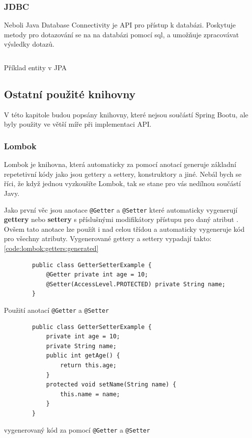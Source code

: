 \subsubsection*{JDBC}\label{sec:impl:jdbc}
Neboli Java Database Connectivity je API pro přístup k databázi. Poskytuje metody pro dotazování se na na databázi pomocí \gls{sql}, a umožňuje zpracovávat výsledky dotazů.

\begin{listing}[ht!]
    \inputminted[]{Java}{resources/code/impl/EnemyDTO.java}
    \caption{Příklad entity v JPA}
    \label{code:jpa_entity}
\end{listing}


\subsection{Ostatní použité knihovny} %
V této kapitole budou popsány knihovny, které nejsou součástí Spring Bootu, ale byly použity ve větší míře při implementaci API.

\subsubsection*{Lombok}\label{sec:impl:lombok}
Lombok je knihovna, která automaticky za pomocí anotací generuje základní repetetivní kódy jako jsou gettery a settery, konstruktory a jiné. Nebál bych se říci, že když jednou vyzkoušíte Lombok, tak se stane pro vás nedílnou součástí Javy.

Jako první věc jsou anotace \texttt{@Getter} a \texttt{@Setter} které automaticky vygenerují \textbf{gettery} nebo \textbf{settery} s příslušnými modifikátory přístupu pro daný atribut . Ovšem tato anotace lze použít i nad celou třídou a automaticky vygeneruje kód pro všechny atributy. Vygenerované gettery a settery vypadají takto: \ref{code:lombok:getters:generated}
\begin{listing}[H]
    \begin{verbatim}
        public class GetterSetterExample {
            @Getter private int age = 10;
            @Setter(AccessLevel.PROTECTED) private String name;
        }
     \end{verbatim}
    \caption{Použití anotací \texttt{@Getter} a \texttt{@Setter}}
    \label{code:lombok:getters}
\end{listing}

\begin{listing}[H]
    \begin{verbatim}
        public class GetterSetterExample {
            private int age = 10;
            private String name;
            public int getAge() {
                return this.age;
            }
            protected void setName(String name) {
                this.name = name;
            }
        }
     \end{verbatim}
    \caption{vygenerovaný kód za pomocí \texttt{@Getter} a \texttt{@Setter}}
    \label{code:lombok:getters:generated}
\end{listing}

